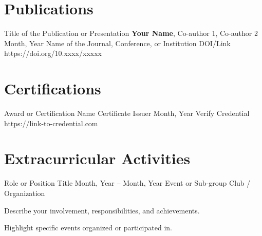 \documentclass[11pt, a4paper]{article}
\begin{document}

\section{Publications}
\cvPublication
    {Title of the Publication or Presentation}
    {\textbf{Your Name}, Co-author 1, Co-author 2}
    {Month, Year}
    {Name of the Journal, Conference, or Institution}
    {DOI/Link}
    {https://doi.org/10.xxxx/xxxxx}


\section{Certifications}
\cvCert
    {Award or Certification Name}
    {Certificate Issuer}
    {Month, Year}
    {Verify Credential}
    {https://link-to-credential.com}


\section{Extracurricular Activities}
\cvExtracurricularActivity
    {Role or Position Title}
    {Month, Year – Month, Year}
    {Event or Sub-group}
    {Club / Organization}
    {
        \item Describe your involvement, responsibilities, and achievements.
        \item Highlight specific events organized or participated in.
    }

\end{document}
